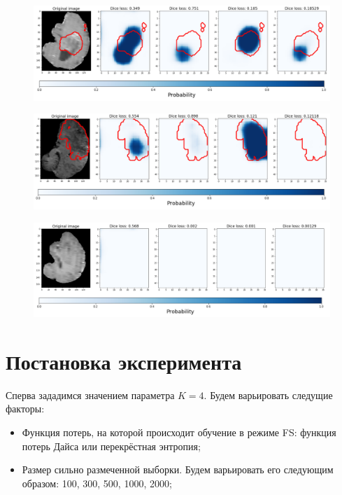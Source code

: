 \begin{figure}[h!] 
  \center
  \includegraphics [scale=0.5] {images/series_dice_4.png}

\end{figure}

\begin{figure}[h!] 
  \center
  \includegraphics [scale=0.5] {images/series_dice_5.png}

\end{figure}


\begin{figure}[h!] 
  \center
  \includegraphics [scale=0.5] {images/series_dice_6.png}

\end{figure}

\newpage
\section{Постановка эксперимента}

Сперва зададимся значением параметра $K = 4$. Будем варьировать следущие факторы:

\begin{itemize}
    \item Функция потерь, на которой происходит обучение в режиме FS: функция потерь Дайса или перекрёстная энтропия;
    \item Размер сильно размеченной выборки. Будем варьировать его следующим образом: 100, 300, 500, 1000, 2000; 
\end{itemize}

